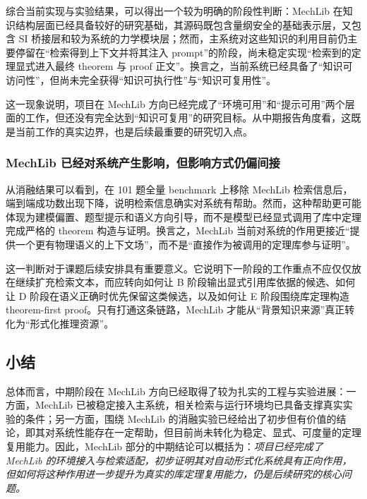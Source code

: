 \documentclass[12pt,a4paper]{ctexart}
\begin{document}
综合当前实现与实验结果，可以得出一个较为明确的阶段性判断：MechLib 在知识结构层面已经具备较好的研究基础，其源码既包含量纲安全的基础表示层，又包含 SI 桥接层和较为系统的力学模块层；然而，主系统对这些知识的利用目前仍主要停留在“检索得到上下文并将其注入 prompt”的阶段，尚未稳定实现“检索到的定理显式进入最终 theorem 与 proof 正文”。换言之，当前系统已经具备了“知识可访问性”，但尚未完全获得“知识可执行性”与“知识可复用性”。

这一现象说明，项目在 MechLib 方向已经完成了“环境可用”和“提示可用”两个层面的工作，但还没有完全达到“知识可复用”的研究目标。从中期报告角度看，这既是当前工作的真实边界，也是后续最重要的研究切入点。

\subsubsection{MechLib 已经对系统产生影响，但影响方式仍偏间接}

从消融结果可以看到，在 101 题全量 benchmark 上移除 MechLib 检索信息后，端到端成功数出现下降，说明检索信息确实对系统有帮助。然而，这种帮助更可能体现为建模偏置、题型提示和语义方向引导，而不是模型已经显式调用了库中定理完成严格的 theorem 构造与证明。换言之，MechLib 当前对系统的作用更接近“提供一个更有物理语义的上下文场”，而不是“直接作为被调用的定理库参与证明”。

这一判断对于课题后续安排具有重要意义。它说明下一阶段的工作重点不应仅仅放在继续扩充检索文本，而应转向如何让 B 阶段输出显式引用库依据的候选、如何让 D 阶段在语义正确时优先保留这类候选，以及如何让 E 阶段围绕库定理构造 theorem-first proof。只有打通这条链路，MechLib 才能从“背景知识来源”真正转化为“形式化推理资源”。

\subsection{小结}

总体而言，中期阶段在 MechLib 方向已经取得了较为扎实的工程与实验进展：一方面，MechLib 已被稳定接入主系统，相关检索与运行环境均已具备支撑真实实验的条件；另一方面，围绕 MechLib 的消融实验已经给出了初步但有价值的结论，即其对系统性能存在一定帮助，但目前尚未转化为稳定、显式、可度量的定理复用能力。因此，MechLib 部分的中期结论可以概括为：\emph{项目已经完成了 MechLib 的环境接入与检索适配，初步证明其对自动形式化系统具有正向作用，但如何将这种作用进一步提升为真实的库定理复用能力，仍是后续研究的核心问题。}
\end{document}
